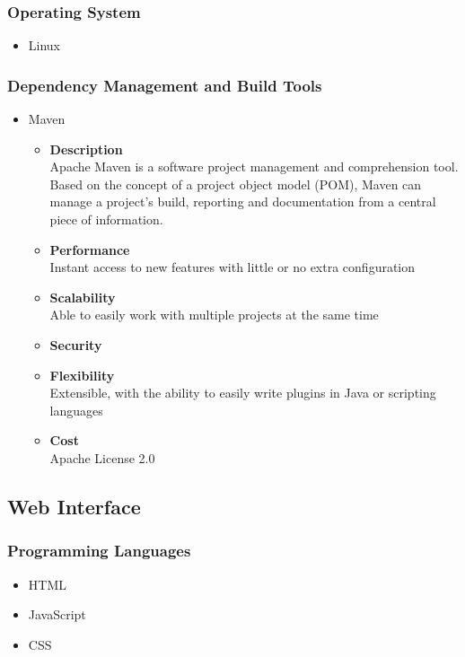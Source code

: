 \documentclass[a4paper,10pt]{article}
\begin{document}
\subsubsection{Operating System}
	\begin{itemize}
		\item Linux
	\end{itemize}

\subsubsection{Dependency Management and Build Tools}
	\begin{itemize}
		\item Maven
			\begin{itemize}
				\item \textbf{Description}\\
					Apache Maven is a software project management and comprehension tool. Based on the concept of a project object model (POM), Maven can manage a project's build, reporting and documentation from a central piece of information. 
				\item \textbf{Performance}\\
					Instant access to new features with little or no extra configuration
				
				\item \textbf{Scalability}\\
					Able to easily work with multiple projects at the same time
				
				\item \textbf{Security}
				
				\item \textbf{Flexibility}\\
					Extensible, with the ability to easily write plugins in Java or scripting languages
				
				\item \textbf{Cost}\\
					Apache License 2.0
					
			\end{itemize}
	\end{itemize}

\subsection{Web Interface}
\subsubsection{Programming Languages}
	\begin{itemize}
		\item HTML			
		\item JavaScript			
		\item CSS			
	\end{itemize}
\end{document}
